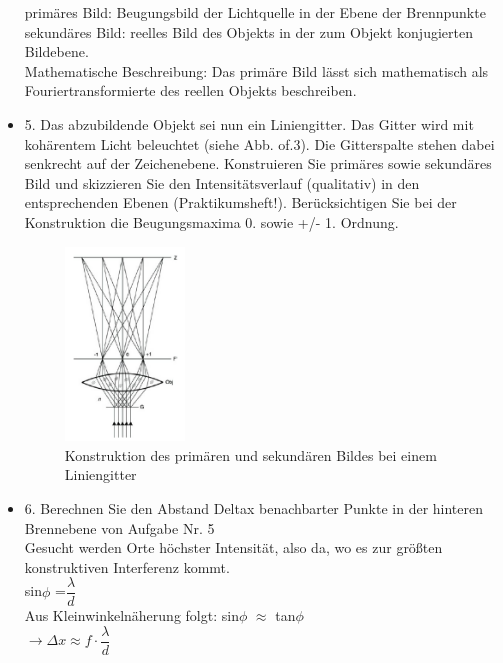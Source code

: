 \begin{itemize}
	primäres Bild: Beugungsbild der Lichtquelle in der Ebene der Brennpunkte\\
	sekundäres Bild: reelles Bild des Objekts in der zum Objekt konjugierten Bildebene. \\
	Mathematische Beschreibung: 
Das primäre Bild lässt sich mathematisch als Fouriertransformierte des reellen Objekts beschreiben.
	\item 5. Das abzubildende Objekt sei nun ein Liniengitter. Das Gitter wird mit kohärentem Licht beleuchtet
	(siehe Abb. of.3). Die Gitterspalte stehen dabei senkrecht auf der Zeichenebene. Konstruieren
	Sie primäres sowie sekundäres Bild und skizzieren Sie den Intensitätsverlauf (qualitativ)
	in den entsprechenden Ebenen (Praktikumsheft!). Berücksichtigen Sie bei der Konstruktion
	die Beugungsmaxima 0. sowie +/- 1. Ordnung.\\
	\begin{figure}[!h]
\includegraphics[width=0.3\textwidth]{abes}
\caption{Konstruktion des primären und sekundären Bildes bei einem Liniengitter} 
	\end{figure}
	\item 6. Berechnen Sie den Abstand Deltax benachbarter Punkte in der hinteren Brennebene von Aufgabe
	Nr. 5\\
	Gesucht werden Orte höchster Intensität, also da, wo es zur größten konstruktiven Interferenz kommt.\\
	sin$\phi$ =$\dfrac{\lambda}{d}$\\
	Aus Kleinwinkelnäherung folgt: 
	sin$\phi$ $\approx$ tan$\phi$ \\
	$\rightarrow \Delta x \approx f \cdot \dfrac{\lambda}{d}$
	

\end{itemize}
